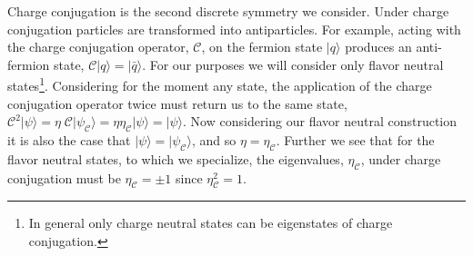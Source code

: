 Charge conjugation is the second discrete symmetry we consider. Under charge conjugation particles are transformed into antiparticles. For example, acting with the charge conjugation operator, $\mathcal{C}$, on the fermion state $|q\rangle$ produces an anti-fermion state, $\mathcal{C} |q \rangle =  | \bar{q} \rangle$. For our purposes we will consider only flavor neutral states\footnote{In general only charge neutral states can be eigenstates of charge conjugation.}.  Considering for the moment any state, the application of the charge conjugation operator twice must return us to the same state,  $\mathcal{C}^2 | \psi \rangle = \eta \; \mathcal{C} | \psi_{\mathcal{C}} \rangle = \eta \eta_{\mathcal{C}} | \psi \rangle = | \psi \rangle$. Now considering our flavor neutral construction it is also the case that $ | \psi \rangle = | \psi_{\mathcal{C}} \rangle$, and so $\eta = \eta_{\mathcal{C}}$. Further we see that for the flavor neutral states, to which we specialize, the eigenvalues, $\eta_{\mathcal{C}}$, under charge conjugation must be $\eta_{\mathcal{C}} = \pm 1$ since $\eta_{\mathcal{C}}^2 = 1$. 

